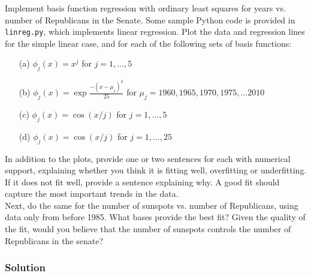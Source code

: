 \documentclass[submit]{harvardml}
\begin{document}
\begin{problem} 

Implement basis function regression with ordinary least squares for
years vs. number of Republicans in the Senate. Some sample Python code
is provided in \verb|linreg.py|, which implements linear regression.
Plot the data and regression lines for the simple linear case, and for
each of the following sets of basis functions:
\begin{itemize}
	\item[(a)] $\phi_j(x) = x^j$ for $j=1, \ldots, 5$ 
	\item[(b)] $\phi_j(x) = \exp{\frac{-(x-\mu_j)^2}{25}}$ for $\mu_j=1960, 1965, 1970, 1975, \ldots 2010$
	\item[(c)] $\phi_j(x) = \cos(x / j)$ for $j=1, \ldots, 5$
	\item[(d)] $\phi_j(x) = \cos(x / j)$ for $j=1, \ldots, 25$
\end{itemize}
In addition to the plots, provide one or two sentences for each with
numerical support, explaining whether you think it is fitting well,
overfitting or underfitting.  If it does not fit well, provide a
sentence explaining why. A good fit should capture the most important
trends in the data.\\ 

\noindent Next, do the same for the number of sunspots vs. number of
Republicans, using data only from before 1985.  What bases provide the
best fit?  Given the quality of the fit, would you believe that the
number of sunspots controls the number of Republicans in the senate?


\end{problem}



\subsubsection*{Solution}
\end{document}
